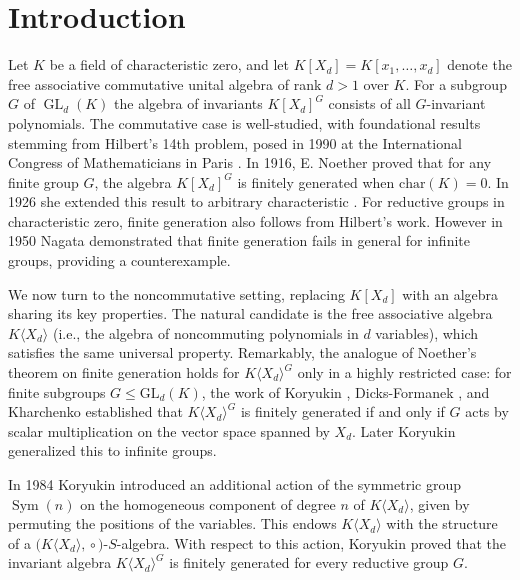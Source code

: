 \documentclass{amsart}[12pt]
\theoremstyle{definition}
\DeclareMathOperator{\Sym}{Sym}
\DeclareMathOperator{\GL}{GL}
\newcommand{\action}{\!\circ}
\newcommand{\KXd}{K\langle X_d\rangle}
\newcommand{\KSS}{\big(\KXd,\action\big)}
\begin{document}
\maketitle

\section{\textbf{Introduction}}
Let $K$ be a field of characteristic zero, and let $K[X_d] = K[x_1, \ldots, x_d]$ denote the free associative commutative unital algebra of rank $d > 1$ over $K$.
For a subgroup $G$ of $\GL_d(K)$ the algebra of invariants $K[X_d]^G$ consists of all $G$-invariant polynomials.
The commutative case is well-studied, with foundational results stemming from Hilbert's 14th problem, posed in 1990 at the International Congress of Mathematicians in Paris \cite{Hi}.
In 1916, E. Noether \cite{No1} proved that for any finite group $G$, the algebra $K[X_d]^G$ is finitely generated when $\text{char}(K) = 0$.
In 1926 she extended this result to arbitrary characteristic \cite{No2}.
For reductive groups in characteristic zero, finite generation also follows from Hilbert's work.
However in 1950 Nagata \cite{Na} demonstrated that finite generation fails in general for infinite groups, providing a counterexample.

We now turn to the noncommutative setting, replacing $K[X_d]$ with an algebra sharing its key properties. The natural candidate is the free associative algebra $\KXd$
(i.e., the algebra of noncommuting polynomials in $d$ variables), which satisfies the same universal property.
Remarkably, the analogue of Noether's theorem on finite generation holds for $\KXd^G$ only in a highly restricted case:
for finite subgroups $G \leq \text{GL}_d(K)$, the work of Koryukin \cite{Kor}, Dicks-Formanek \cite{DiFo}, and Kharchenko \cite{Kh2}
established that $\KXd^G$ is finitely generated if and only if $G$ acts by scalar multiplication on the vector space spanned by $X_d$.
Later Koryukin \cite{Kor} generalized this to infinite groups.

In 1984 Koryukin \cite{Kor} introduced an additional action of the symmetric group $\Sym(n)$ on the homogeneous component of degree $n$ of $\KXd$,
given by permuting the positions of the variables. This endows $\KXd$ with the structure of a $\KSS$-$S$-algebra.
With respect to this action, Koryukin proved that the invariant algebra $\KXd^G$ is finitely generated for every reductive group $G$.
\end{document}
